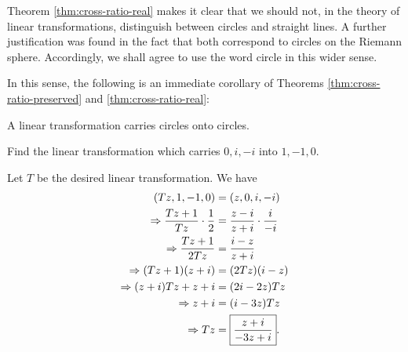 Theorem \ref{thm:cross-ratio-real} makes it clear that we should not, in the theory of linear transformations, distinguish between circles and straight lines. A further justification was found in the fact that both correspond to circles on the Riemann sphere. Accordingly, we shall agree to use the word circle in this wider sense.

In this sense, the following is an immediate corollary of Theorems \ref{thm:cross-ratio-preserved} and \ref{thm:cross-ratio-real}:
\begin{corollary}
	A linear transformation carries circles onto circles.
\end{corollary}

\begin{exercise}
	Find the linear transformation which carries $0, i, -i$ into $1,-1,0$.
	
	\begin{sol}
		Let $T$ be the desired linear transformation. We have
		\begin{align*}
			\left(Tz, 1, -1, 0\right) &=\left(z, 0, i, -i\right) \\
			\Rightarrow \dfrac{Tz+1}{Tz} \cdot \dfrac{1}{2} &=\dfrac{z-i}{z+i} \cdot \dfrac{i}{-i} \\
			\Rightarrow 
			\dfrac{Tz+1}{2Tz} &=\dfrac{i-z}{z+i} \\
			\Rightarrow (Tz+1)(z+i) &=(2Tz)(i-z) \\
			\Rightarrow (z+i)Tz+z+i &=(2i-2z)Tz \\
			\Rightarrow z+i &=(i-3z)Tz \\
			\Rightarrow Tz &=\boxed{\dfrac{z+i}{-3z+i}}.
		\end{align*}
	\end{sol}
\end{exercise}

